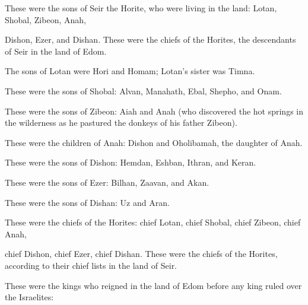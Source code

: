 \begin{scripture}
 These were the sons of Seir the Horite, who were living in the land: Lotan, Shobal, Zibeon, Anah,
 Dishon, Ezer, and Dishan. These were the chiefs of the Horites, the descendants of Seir in the land of Edom.
\everypar{}

 The sons of Lotan were Hori and Homam; Lotan's sister was Timna.
\everypar{}

 These were the sons of Shobal: Alvan, Manahath, Ebal, Shepho, and Onam.
\everypar{}

 These were the sons of Zibeon: Aiah and Anah (who discovered the hot springs in the wilderness as he pastured the donkeys of his father Zibeon).
\everypar{}

 These were the children of Anah: Dishon and Oholibamah, the daughter of Anah.
\everypar{}

 These were the sons of Dishon: Hemdan, Eshban, Ithran, and Keran.
\everypar{}

 These were the sons of Ezer: Bilhan, Zaavan, and Akan.
\everypar{}

 These were the sons of Dishan: Uz and Aran.
\everypar{}

 These were the chiefs of the Horites: chief Lotan, chief Shobal, chief Zibeon, chief Anah,
 chief Dishon, chief Ezer, chief Dishan. These were the chiefs of the Horites, according to their chief lists in the land of Seir.
\everypar{}

 These were the kings who reigned in the land of Edom before any king ruled over the Israelites:
\everypar{}


\end{scripture}
